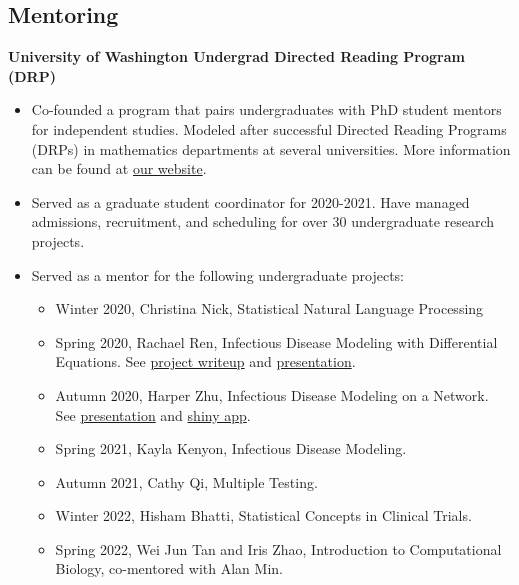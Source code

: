 \documentclass[margin, 10pt]{res} %
\begin{document}
\begin{resume}
{\section{Mentoring}
{\textbf{University of Washington Undergrad Directed Reading Program (DRP)}}
\begin{itemize}
  \item Co-founded a program that pairs undergraduates with PhD student mentors for independent studies. Modeled after successful Directed Reading Programs (DRPs) in mathematics departments at several universities. More information can be found at \href{https://spa-drp.github.io}{our website}. 
  \item Served as a graduate student coordinator for 2020-2021. Have managed admissions, recruitment, and scheduling for over 30 undergraduate research projects. 
  \item Served as a mentor for the following undergraduate projects:
  \begin{itemize}
  \item Winter 2020, Christina Nick, Statistical Natural Language Processing
  \item Spring 2020, Rachael Ren, Infectious Disease Modeling with Differential Equations. See \href{https://spa-drp.github.io/writeups/spring2020/rachael.pdf}{project writeup} and \href{https://spa-drp.github.io/writeups/spring2020/rachaelslides.pdf}{presentation}.
  \item Autumn 2020, Harper Zhu, Infectious Disease Modeling on a Network.  See \href{https://spa-drp.github.io/writeups/aut2020/harper-slides.pdf}{presentation} and \href{https://harperzhu.shinyapps.io/DiseaseSimulation/}{shiny app}.
  \item Spring 2021, Kayla Kenyon, Infectious Disease Modeling. 
  \item Autumn 2021, Cathy Qi, Multiple Testing. 
  \item Winter 2022, Hisham Bhatti, Statistical Concepts in Clinical Trials.
 \item Spring 2022, Wei Jun Tan and Iris Zhao, Introduction to Computational Biology, co-mentored with Alan Min. 
 \end{itemize}
 \end{itemize}

}
\end{resume}
\end{document}

